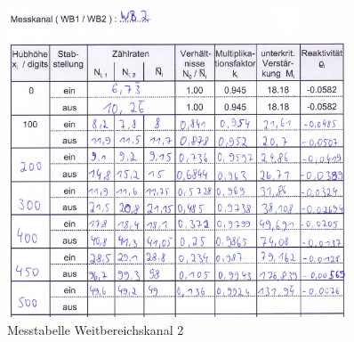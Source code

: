 \documentclass[12pt,german]{article}
\begin{document}
    \begin{figure}[H]
        \centering
        \includegraphics[width=0.9\textwidth]{messtabelle_wb2.png}
        \caption{Messtabelle Weitbereichskanal 2}
    \end{figure}
\end{document}
